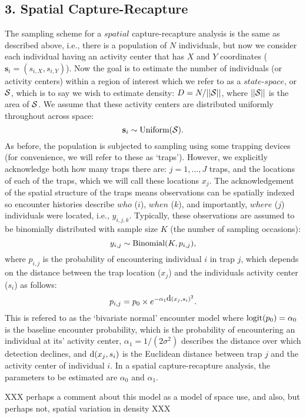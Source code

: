 \documentclass{book}
\begin{document}
\subsection*{3. Spatial Capture-Recapture}

The sampling scheme for a $spatial$ capture-recapture analysis is the same as described above, i.e., there is a population of $N$ individuals, but now we consider each individual having an activity center that has $X$ and $Y$ coordinates ($\textbf{s}_i=(s_{i,X},s_{i,Y})$). Now the goal is to estimate the number of individuals (or activity centers) within a region of interest which we refer to as a $state$-$space$, or ${\cal S}$, which is to say we wish to estimate density: $D = N/||{\cal S}||$, where $||{\cal S}||$ is the area of ${\cal S}$. We assume that these activity centers are distributed uniformly throughout across space:
\[
\textbf{s}_i \sim \hbox{Uniform}({\cal S}).
\]
As before, the population is subjected to sampling using some trapping devices (for convenience, we will refer to these as `traps'). However, we explicitly acknowledge both how many traps there are: $j=1,...,J$ traps, and the locations of each of the traps, which we will call these locations $x_j$. The acknowledgement of the spatial structure of the traps means observations can be spatially indexed so encounter histories describe $who$ ($i$), $when$ ($k$), and importantly, $where$ ($j$) individuals were located, i.e., $y_{i,j,k}$. Typically, these observations are assumed to be binomially distributed with sample size $K$ (the number of sampling occasions):
\[
y_{i,j} \sim \hbox{Binomial}(K,p_{i,j}),
\]
where $p_{i,j}$ is the probability of encountering individual $i$ in trap $j$, which depends on the distance between the trap location ($x_j$) and the individuals activity center ($s_i$) as follows:
\begin{equation}
p_{i,j} = p_0 \times e^{-\alpha_1 \hbox{d}(x_{j},s_{i})^{2}}.
\end{equation}
This is refered to as the `bivariate normal' encounter model where $\hbox{logit}(p_0) = \alpha_0$ is the baseline encounter probability, which is the probability of encountering an individual at its' activity center, $\alpha_1 = 1/(2\sigma^2)$ describes the distance over which detection declines, and $\hbox{d}(x_{j},s_{i})$ is the Euclidean distance between trap $j$ and the activity center of individual $i$. In a spatial capture-recapture analysis, the parameters to be estimated are $\alpha_0$ and $\alpha_1$.

XXX perhaps a comment about this model as a model of space use, and also, but perhaps not, spatial variation in density XXX
\end{document}
